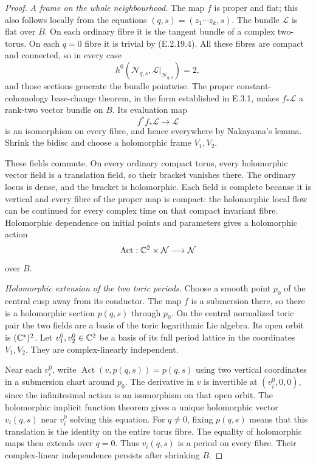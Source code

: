 \begin{proof}
\emph{A frame on the whole neighbourhood.}
The map $f$ is proper and flat; this
also follows locally from the equations
$(q,s)=(z_1\cdots z_k,s)$.
The bundle $\mathcal L$ is flat over
$B$.  On each ordinary fibre it is
the tangent bundle of a complex
two-torus.  On each $q=0$ fibre it
is trivial by (E.2.19.4).  All these
fibres are compact and connected,
so in every case
\[
 h^0(\mathcal N_{q,s},
       \mathcal L|_{\mathcal N_{q,s}})=2,
\]
and those sections generate the
bundle pointwise.  The proper
constant-cohomology base-change
theorem, in the form established
in E.3.1, makes $f_*\mathcal L$
a rank-two vector bundle on $B$.
Its evaluation map
\[
 f^*f_*\mathcal L\longrightarrow\mathcal L
 \tag{E.2.19.5}
\]
is an isomorphism on every fibre,
and hence everywhere by Nakayama's
lemma.  Shrink the bidisc and
choose a holomorphic frame $V_1,V_2$.

These fields commute.  On every
ordinary compact torus, every
holomorphic vector field is a
translation field, so their
bracket vanishes there.  The
ordinary locus is dense, and
the bracket is holomorphic.
Each field is complete because
it is vertical and every fibre
of the proper map is compact:
the holomorphic local flow can
be continued for every complex
time on that compact invariant
fibre.  Holomorphic dependence
on initial points and parameters
gives a holomorphic action
\[
 \operatorname{Act}:\mathbb C^2\times
       \mathcal N\longrightarrow\mathcal N
\]
over $B$.

\emph{Holomorphic extension of the two toric periods.}
Choose a smooth point $p_0$ of the
central cusp away from its conductor.
The map $f$ is a submersion there,
so there is a holomorphic section
$p(q,s)$ through $p_0$.
On the central normalized toric
pair the two fields are a basis
of the toric logarithmic Lie
algebra.  Its open orbit is
$(\mathbb C^*)^2$.  Let
$v_1^0,v_2^0\in\mathbb C^2$ be a
basis of its full period lattice
in the coordinates $V_1,V_2$.
They are complex-linearly
independent.

Near each $v_i^0$, write
$\operatorname{Act}(v,p(q,s))=p(q,s)$
using two vertical coordinates
in a submersion chart around
$p_0$.  The derivative in $v$
is invertible at $(v_i^0,0,0)$,
since the infinitesimal action
is an isomorphism on that open
orbit.  The holomorphic implicit
function theorem gives a unique
holomorphic vector $v_i(q,s)$
near $v_i^0$ solving this equation.
For $q\ne0$, fixing $p(q,s)$
means that this translation is
the identity on the entire
torus fibre.  The equality of
holomorphic maps then extends
over $q=0$.  Thus $v_i(q,s)$
is a period on every fibre.
Their complex-linear
independence persists after
shrinking $B$.


\end{proof}
